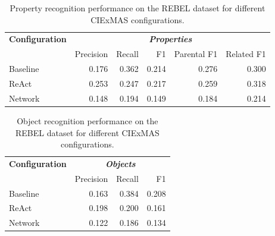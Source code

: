 \documentclass[a4paper,oneside,bibliography=totoc]{scrbook}
\begin{document}
\begin{table}[h]
  \centering
  \begin{tabular}{l|rrrrr}
    \toprule
    \textbf{Configuration} & \multicolumn{5}{c}{\textit{\textbf{Properties}}}                                             \\
                           & Precision                                        & Recall & F1    & Parental F1 & Related F1 \\
    \midrule
    Baseline               & 0.176                                            & 0.362  & 0.214 & 0.276       & 0.300      \\
    {\ac{ReAct}}           & 0.253                                            & 0.247  & 0.217 & 0.259       & 0.318      \\
    Network                & 0.148                                            & 0.194  & 0.149 & 0.184       & 0.214      \\
    \bottomrule
  \end{tabular}
  \caption{Property recognition performance on the REBEL dataset for different CIExMAS configurations.}
  \label{tab:rebel_properties}
\end{table}

\begin{table}[h]
  \centering
  \begin{tabular}{l|rrr}
    \toprule
    \textbf{Configuration} & \multicolumn{3}{c}{\textit{\textbf{Objects}}}                  \\
                           & Precision                                     & Recall & F1    \\
    \midrule
    Baseline               & 0.163                                         & 0.384  & 0.208 \\
    {\ac{ReAct}}           & 0.198                                         & 0.200  & 0.161 \\
    Network                & 0.122                                         & 0.186  & 0.134 \\
    \bottomrule
  \end{tabular}
  \caption{Object recognition performance on the REBEL dataset for different CIExMAS configurations.}
  \label{tab:rebel_objects}
\end{table}
\end{document}
